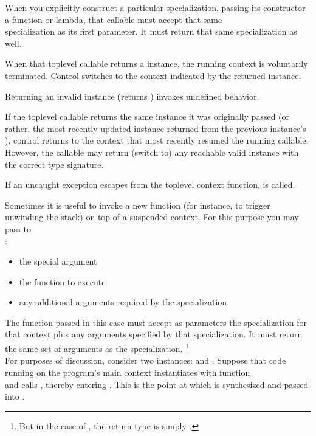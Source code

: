 When you explicitly construct a particular \ectxargs specialization, passing
its constructor a function or lambda, that callable must accept that same\\
\ectxargs specialization as its first parameter. It must return that
same \ectxargs specialization as well.

When that toplevel callable returns a \ectx instance, the running context is
voluntarily terminated. Control switches to the context indicated by the
returned \ectx instance.

Returning an invalid \ectx instance (\opbool returns ) invokes
undefined behavior.

If the toplevel callable returns the same \ectx instance it was originally
passed (or rather, the most recently updated instance returned from the
previous instance's \op), control returns to the context that most recently
resumed the running callable. However, the callable may return (switch to)
any reachable valid \ectx instance with the correct type signature.


\label{subsec:exceptions}
If an uncaught exception escapes from the toplevel context function,
 is called.


Sometimes it is useful to invoke a new function (for instance, to trigger
unwinding the stack) on top of a suspended context. For this purpose you may
pass to\\
\ectxop:

\begin{itemize}
  \item the special argument 
  \item the function to execute
  \item any additional arguments required by the \ectx specialization.
\end{itemize}

The function passed in this case must accept as parameters the \ectx
specialization for that context plus any arguments specified by that
specialization. It must return the same set of arguments as the \ectx
specialization. \footnote{But in the case of \ectxvoid, the return
type is simply .}\\

For purposes of discussion, consider two \ectxvoid
instances:  and . Suppose that code running
on the program's main context instantiates  with function\\
 and calls , thereby
entering . This is the point at which  is synthesized
and passed into .

